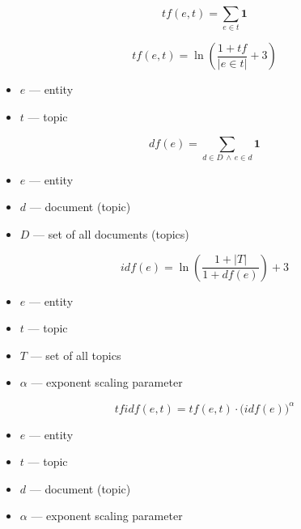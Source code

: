 \[
tf(e, t) =\sum_{e \in t} \mathbf{1}
\]

\[
tf(e, t) = \ln\left(\frac{1 + tf}{|e \in t|} + 3\right)
\]
\begin{itemize}
  \item $e$ — entity
  \item $t$ — topic
\end{itemize}

\[
df(e) = \sum_{d \in D \,\land\, e \in d} \mathbf{1}
\]

\begin{itemize}
  \item $e$ — entity
  \item $d$ — document (topic)
  \item $D$ — set of all documents (topics)
\end{itemize}

\[
idf(e) = \ln\left(\frac{1 + |T|}{1 + df(e)}\right) + 3
\]

\begin{itemize}
  \item $e$ — entity
  \item $t$ — topic
  \item $T$ — set of all topics
  \item $\alpha$ — exponent scaling parameter
\end{itemize}

\[
tfidf(e, t) = tf(e, t) \cdot \big( idf(e) \big)^{\alpha}
\]

\begin{itemize}
  \item $e$ — entity
  \item $t$ — topic
  \item $d$ — document (topic)
  \item $\alpha$ — exponent scaling parameter
\end{itemize}